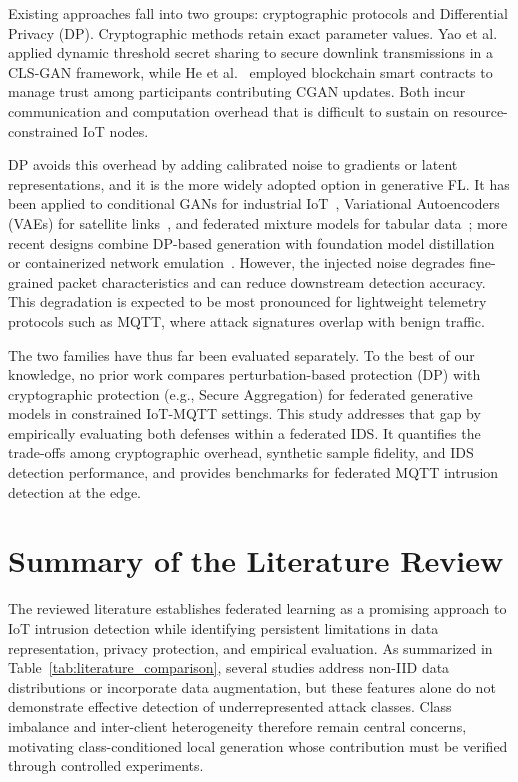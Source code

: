 Existing approaches fall into two groups: cryptographic protocols and Differential Privacy (DP). Cryptographic methods retain exact parameter values. Yao et al.~\cite{yao2024} applied dynamic threshold secret sharing to secure downlink transmissions in a CLS-GAN framework, while He et al.~\cite{he2023} employed blockchain smart contracts to manage trust among participants contributing CGAN updates. Both incur communication and computation overhead that is difficult to sustain on resource-constrained IoT nodes.

DP avoids this overhead by adding calibrated noise to gradients or latent representations, and it is the more widely adopted option in generative FL. It has been applied to conditional GANs for industrial IoT~\cite{hamouda2024}, Variational Autoencoders (VAEs) for satellite links~\cite{salim2025}, and federated mixture models for tabular data~\cite{duan2023}; more recent designs combine DP-based generation with foundation model distillation~\cite{jiao2025} or containerized network emulation~\cite{shettar2026}. However, the injected noise degrades fine-grained packet characteristics and can reduce downstream detection accuracy. This degradation is expected to be most pronounced for lightweight telemetry protocols such as MQTT, where attack signatures overlap with benign traffic.

The two families have thus far been evaluated separately. To the best of our knowledge, no prior work compares perturbation-based protection (DP) with cryptographic protection (e.g., Secure Aggregation) for federated generative models in constrained IoT-MQTT settings. This study addresses that gap by empirically evaluating both defenses within a federated IDS. It quantifies the trade-offs among cryptographic overhead, synthetic sample fidelity, and IDS detection performance, and provides benchmarks for federated MQTT intrusion detection at the edge.

\clearpage
\section{Summary of the Literature Review}\label{sec:lit_summary}

The reviewed literature establishes federated learning as a promising approach to IoT intrusion detection while identifying persistent limitations in data representation, privacy protection, and empirical evaluation. As summarized in Table~\ref{tab:literature_comparison}, several studies address non-IID data distributions or incorporate data augmentation, but these features alone do not demonstrate effective detection of underrepresented attack classes. Class imbalance and inter-client heterogeneity therefore remain central concerns, motivating class-conditioned local generation whose contribution must be verified through controlled experiments.

